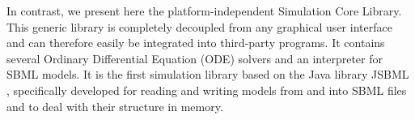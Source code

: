 \documentclass{bioinfo}
\begin{document}
In contrast, we present here the platform-independent Simulation Core
Library. This generic library is completely decoupled from any graphical user
interface and can therefore easily be integrated into third-party programs. 
It contains several Ordinary Differential Equation (ODE)
solvers and an interpreter for SBML models. It is the first simulation library
 based on the Java library JSBML \citep{Draeger2011b}, specifically
developed for reading and writing models from and into SBML
files and to deal with their structure in memory.

\end{document}
